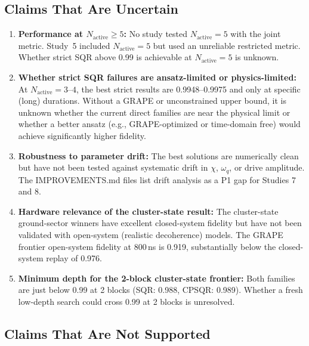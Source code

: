 \documentclass[11pt,letterpaper]{article}
\newcommand{\nact}{N_{\text{active}}}
\begin{document}
\subsection{Claims That Are Uncertain}

\begin{enumerate}
\item \textbf{Performance at $\nact \ge 5$:}
  No study tested $\nact = 5$ with the joint metric.  Study~5 included
  $\nact = 5$ but used an unreliable restricted metric.  Whether strict SQR
  above 0.99 is achievable at $\nact = 5$ is unknown.

\item \textbf{Whether strict SQR failures are ansatz-limited or physics-limited:}
  At $\nact = 3$--$4$, the best strict results are 0.9948--0.9975 and only
  at specific (long) durations.  Without a GRAPE or unconstrained upper bound,
  it is unknown whether the current direct families are near the physical limit
  or whether a better ansatz (e.g., GRAPE-optimized or time-domain free) would
  achieve significantly higher fidelity.

\item \textbf{Robustness to parameter drift:}
  The best solutions are numerically clean but have not been tested against
  systematic drift in $\chi$, $\omega_q$, or drive amplitude.
  The IMPROVEMENTS.md files list drift analysis as a P1 gap for Studies 7 and 8.

\item \textbf{Hardware relevance of the cluster-state result:}
  The cluster-state ground-sector winners have excellent closed-system fidelity
  but have not been validated with open-system (realistic decoherence) models.
  The GRAPE frontier open-system fidelity at 800\,ns is 0.919, substantially
  below the closed-system replay of 0.976.

\item \textbf{Minimum depth for the 2-block cluster-state frontier:}
  Both families are just below 0.99 at 2 blocks (SQR: 0.988, CPSQR: 0.989).
  Whether a fresh low-depth search could cross 0.99 at 2 blocks is unresolved.
\end{enumerate}

\subsection{Claims That Are Not Supported}
\end{document}
